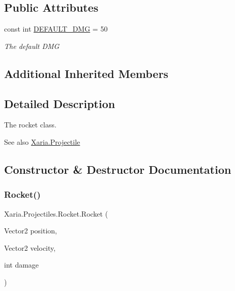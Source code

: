 \subsection*{Public Attributes}
\begin{DoxyCompactItemize}
\item 
const int \hyperlink{classXaria_1_1Projectiles_1_1Rocket_a6a32d364bc08a9545608a991435146ea}{D\+E\+F\+A\+U\+L\+T\+\_\+\+D\+MG} = 50
\begin{DoxyCompactList}\small\item\em The default D\+MG \end{DoxyCompactList}\end{DoxyCompactItemize}
\subsection*{Additional Inherited Members}


\subsection{Detailed Description}
The rocket class. 

\begin{DoxySeeAlso}{See also}
\hyperlink{classXaria_1_1Projectile}{Xaria.\+Projectile}


\end{DoxySeeAlso}


\subsection{Constructor \& Destructor Documentation}
\mbox{\label{classXaria_1_1Projectiles_1_1Rocket_ab4cd2dbf1d174525ae0d5c5b304ff725}} 
\subsubsection{\texorpdfstring{Rocket()}{Rocket()}}
{\footnotesize\ttfamily Xaria.\+Projectiles.\+Rocket.\+Rocket (\begin{DoxyParamCaption}\item[{Vector2}]{position,  }\item[{Vector2}]{velocity,  }\item[{int}]{damage }\end{DoxyParamCaption})\hspace{0.3cm}{\ttfamily [inline]}}



